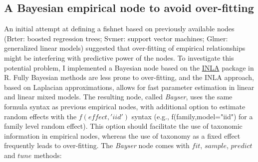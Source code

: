 \documentclass{dragonfly-report}\usepackage[]{graphicx}\usepackage[]{color}
\begin{document}
\subsection{A Bayesian empirical node to avoid over-fitting}

An initial attempt at defining a fishnet based on previously available nodes (Brter: boosted regression trees; Svmer: support vector machines; Glmer: generalized linear models) suggested that over-fitting of empirical relationships might be interfering with predictive power of the nodes. To investigate this potential problem, I implemented a Bayesian node based on the \href{http://www.r-inla.org/}{INLA} package in R. Fully Bayesian methods are less prone to over-fitting, and the INLA approach, based on Laplacian approximations, allows for fast parameter estimation in linear and linear mixed models. The resulting node, called \emph{Bayser}, uses the same formula syntax as previous empirical nodes, with additional option to estimate random effects with the $f(effect, 'iid')$ syntax (e.g., f(family,model="iid") for a family level random effect). This option should facilitate the use of taxonomic information in empirical nodes, whereas the use of taxonomy as a fixed effect frequently leads to over-fitting. The \emph{Bayser} node comes with $fit$, $sample$, $predict$ and $tune$ methods:
\end{document}
